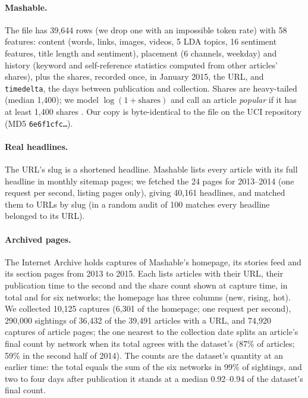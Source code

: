 \documentclass[10pt,a4paper,twocolumn]{article}
\begin{document}
\paragraph{Mashable.} The file has 39{,}644 rows (we drop one with an impossible token rate) with 58 features:
content (words, links, images, videos, 5 LDA topics, 16 sentiment features, title length and sentiment),
placement (6 channels, weekday) and history (keyword and self-reference statistics computed from other
articles' shares), plus the shares, recorded once, in January 2015, the URL, and \texttt{timedelta}, the days
between publication and collection. Shares are heavy-tailed (median 1{,}400); we model
$\log(1{+}\text{shares})$ and call an article \emph{popular} if it has at least 1{,}400 shares
\citep{fernandes2015}. Our copy is byte-identical to the file on the UCI repository (MD5 \texttt{6e6f1cfc\ldots}).

\paragraph{Real headlines.} The URL's slug is a shortened headline. Mashable lists every article with its full
headline in monthly sitemap pages; we fetched the 24 pages for 2013--2014 (one request per second, listing pages
only), giving 40{,}161 headlines, and matched them to URLs by slug (in a random audit of 100 matches every
headline belonged to its URL).

\paragraph{Archived pages.} The Internet Archive holds captures of Mashable's homepage, its stories feed and its
section pages from 2013 to 2015. Each lists articles with their URL, their publication time to the second and the
share count shown at capture time, in total and for six networks; the homepage has three columns (new, rising,
hot). We collected 10{,}125 captures (6{,}301 of the homepage; one request per second), 290{,}000 sightings of
36{,}432 of the 39{,}491 articles with a URL, and 74{,}920 captures of article pages; the one nearest to the collection date splits an article's final count by network when its total agrees with the dataset's (87\% of articles; 59\% in the second half of 2014). The counts are the dataset's quantity at an earlier time: the total
equals the sum of the six networks in 99\% of sightings, and two to four days after publication it stands at a
median 0.92--0.94 of the dataset's final count.
\end{document}
